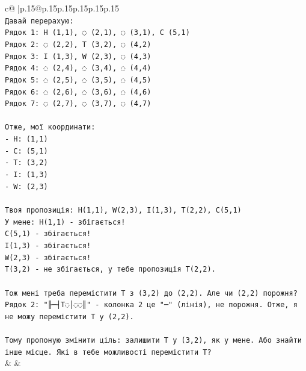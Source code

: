 \documentclass{article}
\begin{document}
{\begin{supertabular}{c@{$\;$}|p{.15\linewidth}@{}p{.15\linewidth}p{.15\linewidth}p{.15\linewidth}p{.15\linewidth}p{.15\linewidth}}
{{{\\ 
\texttt{Давай перерахую:} \\
\texttt{Рядок 1: H (1,1), ◌ (2,1), ◌ (3,1), C (5,1)} \\
\texttt{Рядок 2: ◌ (2,2), T (3,2), ◌ (4,2)} \\
\texttt{Рядок 3: I (1,3), W (2,3), ◌ (4,3)} \\
\texttt{Рядок 4: ◌ (2,4), ◌ (3,4), ◌ (4,4)} \\
\texttt{Рядок 5: ◌ (2,5), ◌ (3,5), ◌ (4,5)} \\
\texttt{Рядок 6: ◌ (2,6), ◌ (3,6), ◌ (4,6)} \\
\texttt{Рядок 7: ◌ (2,7), ◌ (3,7), ◌ (4,7)} \\
\\ 
\texttt{Отже, мої координати:} \\
\texttt{{-} H: (1,1)} \\
\texttt{{-} C: (5,1)} \\
\texttt{{-} T: (3,2)} \\
\texttt{{-} I: (1,3)} \\
\texttt{{-} W: (2,3)} \\
\\ 
\texttt{Твоя пропозиція: H(1,1), W(2,3), I(1,3), T(2,2), C(5,1)} \\
\texttt{У мене: H(1,1) {-} збігається!} \\
\texttt{C(5,1) {-} збігається!} \\
\texttt{I(1,3) {-} збігається!} \\
\texttt{W(2,3) {-} збігається!} \\
\texttt{T(3,2) {-} не збігається, у тебе пропозиція T(2,2).} \\
\\ 
\texttt{Тож мені треба перемістити T з (3,2) до (2,2). Але чи (2,2) порожня? Рядок 2: "╟─┤T◌│◌◌║" {-} колонка 2 це "─" (лінія), не порожня. Отже, я не можу перемістити T у (2,2).} \\
\\ 
\texttt{Тому пропоную змінити ціль: залишити T у (3,2), як у мене. Або знайти інше місце. Які в тебе можливості перемістити T?} \\
            }
        }
    }
    & & \\ \\


\end{supertabular}}
\end{document}
